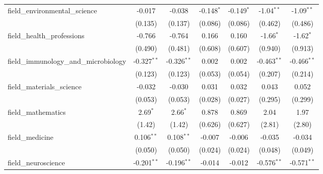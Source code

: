 \begin{tabular}{lcccccc}
   field\_environmental\_science                               & -0.017        & -0.038         & -0.148$^{*}$  & -0.149$^{*}$   & -1.04$^{**}$  & -1.09$^{**}$\\   
                                                               & (0.135)       & (0.137)        & (0.086)       & (0.086)        & (0.462)       & (0.486)\\   
   field\_health\_professions                                  & -0.766        & -0.764         & 0.166         & 0.160          & -1.66$^{*}$   & -1.62$^{*}$\\   
                                                               & (0.490)       & (0.481)        & (0.608)       & (0.607)        & (0.940)       & (0.913)\\   
   field\_immunology\_and\_microbiology                        & -0.327$^{**}$ & -0.326$^{**}$  & 0.002         & 0.002          & -0.463$^{**}$ & -0.466$^{**}$\\   
                                                               & (0.123)       & (0.123)        & (0.053)       & (0.054)        & (0.207)       & (0.214)\\   
   field\_materials\_science                                   & -0.032        & -0.030         & 0.031         & 0.032          & 0.043         & 0.052\\   
                                                               & (0.053)       & (0.053)        & (0.028)       & (0.027)        & (0.295)       & (0.299)\\   
   field\_mathematics                                          & 2.69$^{*}$    & 2.66$^{*}$     & 0.878         & 0.869          & 2.04          & 1.97\\   
                                                               & (1.42)        & (1.42)         & (0.626)       & (0.627)        & (2.81)        & (2.80)\\   
   field\_medicine                                             & 0.106$^{**}$  & 0.108$^{**}$   & -0.007        & -0.006         & -0.035        & -0.034\\   
                                                               & (0.050)       & (0.050)        & (0.024)       & (0.024)        & (0.048)       & (0.049)\\   
   field\_neuroscience                                         & -0.201$^{**}$ & -0.196$^{**}$  & -0.014        & -0.012         & -0.576$^{**}$ & -0.571$^{**}$\\   

\end{tabular}
